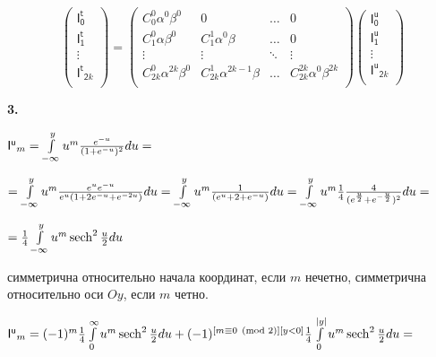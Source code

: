 \documentclass[a4paper,12pt]{article}
\begin{document}
\begin{displaymath}
    \begin{pmatrix}
        \mathsf{I^t_0} \\ \mathsf{I^t_1} \\ \vdots \\ \mathsf{I^t}_{\mathsf{2}k} \\
    \end{pmatrix} = \begin{pmatrix}
        C_0^0 \alpha^0 \beta^0 & 0 & \ldots & 0 \\
        C_1^0 \alpha \beta^{0} & C_1^1 \alpha^{0} \beta & \ldots & 0 \\
        \vdots & \vdots & \ddots & \vdots\\
        C_{2k}^0 \alpha^{2k} \beta^0 & C_{2k}^1 \alpha^{2k - 1} \beta & \ldots & C_{2k}^{2k} \alpha^{0} \beta^{2k} \\
    \end{pmatrix} \begin{pmatrix}
        \mathsf{I^u_0} \\ \mathsf{I^u_1} \\ \vdots \\ \mathsf{I^u}_{\mathsf{2}k} \\
    \end{pmatrix}
\end{displaymath}

\noindent\textbf{3.}

\begin{center}
    $\mathsf{I^u}_m = \int\limits_{-\infty}^y u^m {e^{-u}\over{(1 + e^{-u}})^2} d u =$
\end{center}

\begin{center}
    $= \int\limits_{-\infty}^y u^m {e^{u}e^{-u}\over{e^{u}(1 + 2e^{-u}} + e^{-2u})} d u = \int\limits_{-\infty}^y u^m {1\over{(e^{u} + 2 + e^{-u})}} d u = \int\limits_{-\infty}^y u^m {1\over{4}} {4\over{(e^{u\over{2}} + e^{-{u\over{2}}})^2}} d u =$
\end{center}

\begin{center}
    $= {1\over{4}}\int\limits_{-\infty}^y u^m \operatorname{sech}^2{u\over{2}} d u$
\end{center}

 симметрична относительно начала координат, если $m$ нечетно, симметрична относительно оси $O y$, если $m$ четно. 

\begin{center}
    $\mathsf{I^u}_m = (-1)^m{1\over{4}} \int\limits_0^{\infty} u^m \operatorname{sech}^2{u\over{2}} d u  + (-1)^{[m \equiv 0 \pmod{2}][y < 0]}{1\over{4}}  \int\limits_0^{|y|} u^m \operatorname{sech}^2{u\over{2}} d u = $
\end{center}
\end{document}
